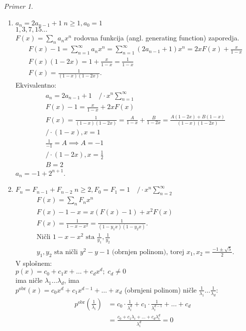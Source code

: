 \documentclass[a4paper, 12pt]{book}
\theoremstyle{definition}
\theoremstyle{remark}
\newtheorem*{ex}{Primer}
\begin{document}
\begin{ex} \text{} \\
  \begin{enumerate}[label=(\arabic*)]
    \item $a_n = 2 a_{n-1} + 1 \; n \geq 1, a_0 = 1$ \\
      $1, 3, 7, 15 \dots$ \\
      $F(x) = \sum_n a_n x^n$ rodovna funkcija (angl. generating function) zaporedja.
      \begin{align*}
        &F(x) - 1 = \sum_{n=1}^{\infty} a_n x^n = \sum_{n=1}^{\infty} (2 a_{n-1} + 1) x^n = 2 x F(x) + \frac{x}{1-x} \\
        &F(x) (1-2x) = 1 + \frac{x}{1-x} = \frac{1}{1-x} \\
        &F(x) = \frac{1}{(1-x) (1-2x)}.
      \end{align*}
      Ekvivalentno:
      \begin{align*}
        &a_n = 2 a_{n-1} + 1 \quad / \cdot x^n \sum_{n=1}^{\infty} \\
        &F(x) - 1 = \frac{x}{1-x} + 2 x F(x) \\
        &F(x) = \frac{1}{(1-x) (1-2x)} = \frac{A}{1-x} + \frac{B}{1-2x} = \frac{A(1-2x) + B(1-x)}{(1-x) (1-2x)} \\
        &/ \cdot (1-x), x=1 \\
        &\frac{1}{-1} = A \implies A = -1 \\
        &/ \cdot (1-2x), x=\frac{1}{2} \\
        &B = 2
      \end{align*}
      $a_n = -1 + 2^{n+1}$.
    \item $F_n = F_{n-1} + F_{n-2} \; n \geq 2, F_0 = F_1 = 1 \quad / \cdot x^n \sum_{n=2}^{\infty}$
      \begin{align*}
        &F(x) = \sum_n F_n x^n \\
        &F(x) - 1 - x = x(F(x) - 1) + x^2 F(x) \\
        &F(x) = \frac{1}{1-x-x^2} = \frac{1}{(1-y_1x)(1-y_2x)}. \\
        &\text{Ničli } 1-x-x^2 \text{ sta } \frac{1}{y_1}, \frac{1}{y_2} \\
        &y_1, y_2 \text{ sta ničli } y^2-y-1 \text{ (obrnjen polinom), torej } x_1,x_2 = \frac{-1 \pm \sqrt{5}}{2}.
      \end{align*}
      V splošnem: \\
      $p(x) = c_0 + c_1 x + \dots + c_d x^d; \; c_d \neq 0$ \\
      ima ničle $\lambda_1 \dots \lambda_d$, ima \\
      $p^{\text{obr}}(x) = c_0 x^d + c_1 x^{d-1} + \dots + x_d$ (obrnjeni polinom) ničle $\frac{1}{\lambda_1} \dots \frac{1}{\lambda_d}$: \\
      \begin{align*}
        p^{\text{obr}}\left(\frac{1}{\lambda_i}\right) &=
          c_0 \cdot \frac{1}{\lambda_i^d} + c_1 \cdot \frac{1}{\lambda_i^{d-1}} + \dots + c_d \\
        &= \frac{c_0 + c_1 \lambda_i + \dots + c_d \lambda_i^d}{\lambda_i^d} = 0
      \end{align*}



\end{enumerate}
\end{ex}
\end{document}
